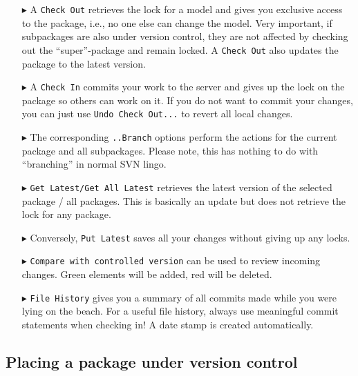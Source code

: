 \begin{enumerate}
  \item[$\blacktriangleright$] A \texttt{Check Out} retrieves the lock for a model and gives you exclusive access to the package, i.e., no one else can change the model. 
  Very important, if subpackages are also under version control, they are not affected by checking out the ``super''-package and remain locked.
  A \texttt{Check Out} also updates the package to the latest version.

\item[$\blacktriangleright$] A \texttt{Check In} commits your work to the server and gives up the lock on the package so others can work on it.
If you do not want to commit your changes, you can just use \texttt{Undo Check Out...} to revert all local changes.

\item[$\blacktriangleright$]  The corresponding \texttt{..Branch} options perform the actions for the current package and all subpackages.
Please note, this has nothing to do with ``branching'' in normal SVN lingo.

\item[$\blacktriangleright$] \texttt{Get Latest/Get All Latest} retrieves the latest version of the selected package / all packages. 
This is basically an update but does not retrieve the lock for any package.

\item[$\blacktriangleright$] Conversely, \texttt{Put Latest} saves all your changes without giving up any locks.

\item[$\blacktriangleright$] \texttt{Compare with controlled version} can be used to review incoming changes. 
Green elements will be added, red will be deleted. 

\item[$\blacktriangleright$] \texttt{File History} gives you a summary of all commits made while you were lying on the beach. 
For a useful file history, always use meaningful commit statements when checking in! 
A date stamp is created automatically.
\end{enumerate}

\subsection{Placing a package under version control}

